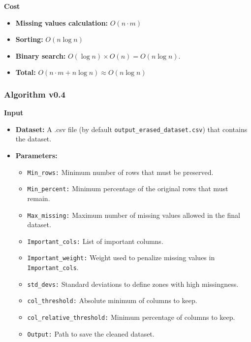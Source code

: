 \documentclass[a4paper,12pt]{article}
\begin{document}
\textbf{Cost}
\begin{itemize}
    \item \textbf{Missing values calculation:} $O(n \cdot m)$
    \item \textbf{Sorting:} $O(n \log n)$
    \item \textbf{Binary search:} $O(\log n) \times O(n) = O(n \log n)$.
    \item \textbf{Total:} $O(n \cdot m + n \log n) \approx O(n \log n)$
\end{itemize}


\subsubsection{Algorithm v0.4}
\textbf{Input}
\begin{itemize}
    \item \textbf{Dataset:} A .csv file (by default \texttt{output\_erased\_dataset.csv}) that contains the dataset.
    \item \textbf{Parameters:}
    \begin{itemize}
        \item \texttt{Min\_rows:} Minimum number of rows that must be preserved.
        \item \texttt{Min\_percent:} Minimum percentage of the original rows that must remain.
        \item \texttt{Max\_missing:} Maximum number of missing values allowed in the final dataset.
        \item \texttt{Important\_cols:} List of important columns.
        \item \texttt{Important\_weight:} Weight used to penalize missing values in \texttt{Important\_cols}.
        \item \texttt{std\_devs:} Standard deviations to define zones with high missingness.
        \item \texttt{col\_threshold:} Absolute minimum of columns to keep.
        \item \texttt{col\_relative\_threshold:} Minimum percentage of columns to keep.
        \item \texttt{Output:} Path to save the cleaned dataset.
    \end{itemize}
\end{itemize}
\end{document}
